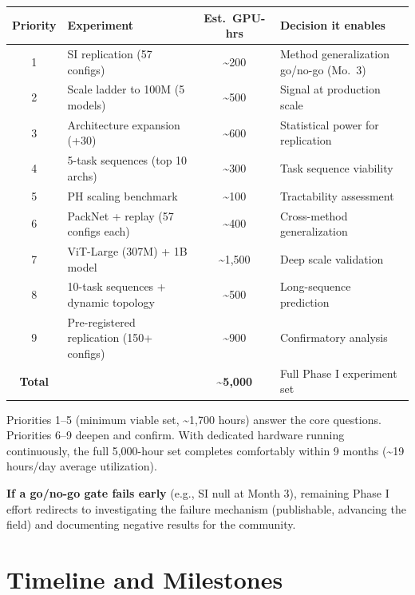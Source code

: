 \documentclass[11pt,letterpaper]{article}
\begin{document}
\begin{center}
\begin{tabular}{@{}clcl@{}}
\toprule
\textbf{Priority} & \textbf{Experiment} & \textbf{Est.\ GPU-hrs} & \textbf{Decision it enables} \\
\midrule
1 & SI replication (57 configs) & \textasciitilde200 & Method generalization go/no-go (Mo.\ 3) \\
2 & Scale ladder to 100M (5 models) & \textasciitilde500 & Signal at production scale \\
3 & Architecture expansion (+30) & \textasciitilde600 & Statistical power for replication \\
4 & 5-task sequences (top 10 archs) & \textasciitilde300 & Task sequence viability \\
5 & PH scaling benchmark & \textasciitilde100 & Tractability assessment \\
6 & PackNet + replay (57 configs each) & \textasciitilde400 & Cross-method generalization \\
7 & ViT-Large (307M) + 1B model & \textasciitilde1,500 & Deep scale validation \\
8 & 10-task sequences + dynamic topology & \textasciitilde500 & Long-sequence prediction \\
9 & Pre-registered replication (150+ configs) & \textasciitilde900 & Confirmatory analysis \\
\midrule
\textbf{Total} & & \textbf{\textasciitilde5,000} & Full Phase I experiment set \\
\bottomrule
\end{tabular}
\end{center}

Priorities 1--5 (minimum viable set, \textasciitilde1,700 hours) answer the core questions. Priorities 6--9 deepen and confirm. With dedicated hardware running continuously, the full 5,000-hour set completes comfortably within 9 months (\textasciitilde19 hours/day average utilization).

\textbf{If a go/no-go gate fails early} (e.g., SI null at Month 3), remaining Phase I effort redirects to investigating the failure mechanism (publishable, advancing the field) and documenting negative results for the community.

\section{Timeline and Milestones}
\end{document}
